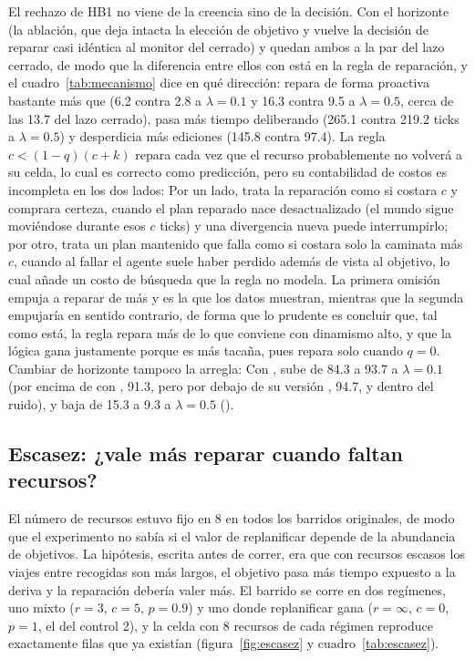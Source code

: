 El rechazo de HB1 no viene de la creencia sino de la decisión. Con el horizonte \ahora{} (la ablación, que deja intacta la elección de objetivo y vuelve la decisión de reparar casi idéntica al monitor del cerrado) \BY{} y \KB{} quedan ambos a la par del lazo cerrado, de modo que la diferencia entre ellos con \llegada{} está en la regla de reparación, y el cuadro~\ref{tab:mecanismo} dice en qué dirección: \BY{} repara de forma proactiva bastante más que \KB{} (6.2 contra 2.8 a $\lambda=0.1$ y 16.3 contra 9.5 a $\lambda=0.5$, cerca de las 13.7 del lazo cerrado), pasa más tiempo deliberando (265.1 contra 219.2 ticks a $\lambda=0.5$) y desperdicia más ediciones (145.8 contra 97.4). La regla $c<(1-q)(c+k)$ repara cada vez que el recurso probablemente no volverá a su celda, lo cual es correcto como predicción, pero su contabilidad de costos es incompleta en los dos lados: Por un lado, trata la reparación como si costara $c$ y comprara certeza, cuando el plan reparado nace desactualizado (el mundo sigue moviéndose durante esos $c$ ticks) y una divergencia nueva puede interrumpirlo; por otro, trata un plan mantenido que falla como si costara solo la caminata más $c$, cuando al fallar el agente suele haber perdido además de vista al objetivo, lo cual añade un costo de búsqueda que la regla no modela. La primera omisión empuja a reparar de más y es la que los datos muestran, mientras que la segunda empujaría en sentido contrario, de forma que lo prudente es concluir que, tal como está, la regla repara más de lo que conviene con dinamismo alto, y que la lógica gana justamente porque es más tacaña, pues repara solo cuando $q=0$. Cambiar de horizonte tampoco la arregla: Con \ahora, \BY{} sube de 84.3 a 93.7 a $\lambda=0.1$ (por encima de \KB{} con \llegada, 91.3, pero por debajo de su versión \ahora, 94.7, y dentro del ruido), y baja de 15.3 a 9.3 a $\lambda=0.5$ ().

\FloatBarrier
\subsection{Escasez: ¿vale más reparar cuando faltan recursos?}\label{sec:res-escasez}

El número de recursos estuvo fijo en 8 en todos los barridos originales, de modo que el experimento no sabía si el valor de replanificar depende de la abundancia de objetivos. La hipótesis, escrita antes de correr, era que con recursos escasos los viajes entre recogidas son más largos, el objetivo pasa más tiempo expuesto a la deriva y la reparación debería valer más. El barrido se corre en dos regímenes, uno mixto ($r=3$, $c=5$, $p=0.9$) y uno donde replanificar gana ($r=\infty$, $c=0$, $p=1$, el del control 2), y la celda con 8 recursos de cada régimen reproduce exactamente filas que ya existían (figura~\ref{fig:escasez} y cuadro~\ref{tab:escasez}).

